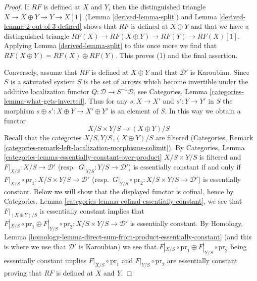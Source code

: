 \begin{proof}

If $RF$ is defined at $X$ and $Y$, then the distinguished triangle
$X \to X \oplus Y \to Y \to X[1]$ (Lemma \ref{derived-lemma-split}) and
Lemma \ref{derived-lemma-2-out-of-3-defined}
shows that $RF$ is defined at $X \oplus Y$ and that we
have a distinguished triangle
$RF(X) \to RF(X \oplus Y) \to RF(Y) \to RF(X)[1]$.
Applying Lemma \ref{derived-lemma-split} to this once more we find
that $RF(X \oplus Y) = RF(X) \oplus RF(Y)$.
This proves (1) and the final assertion.

\medskip\noindent
Conversely, assume that $RF$ is defined at $X \oplus Y$ and that $\mathcal{D}'$
is Karoubian. Since $S$ is a saturated system $S$ is the set of arrows which
become invertible under the additive localization functor
$Q : \mathcal{D} \to S^{-1}\mathcal{D}$, see
Categories, Lemma \ref{categories-lemma-what-gets-inverted}.
Thus for any $s : X \to X'$ and $s' : Y \to Y'$ in $S$ the morphism
$s \oplus s' : X \oplus Y \to X' \oplus Y'$ is an element of $S$.
In this way we obtain a functor
$$
X/S \times Y/S \longrightarrow (X \oplus Y)/S
$$
Recall that the categories $X/S, Y/S, (X \oplus Y)/S$ are filtered
(Categories, Remark
\ref{categories-remark-left-localization-morphisms-colimit}).
By Categories, Lemma \ref{categories-lemma-essentially-constant-over-product}
$X/S \times Y/S$ is filtered and
$F|_{X/S} : X/S \to \mathcal{D}'$ (resp.\ $G|_{Y/S} : Y/S \to \mathcal{D}'$)
is essentially constant if and only if
$F|_{X/S} \circ \text{pr}_1 : X/S \times Y/S \to \mathcal{D}'$
(resp.\ $G|_{Y/S} \circ \text{pr}_2 : X/S \times Y/S \to \mathcal{D}'$)
is essentially constant. Below we will show that the displayed functor
is cofinal, hence by
Categories, Lemma \ref{categories-lemma-cofinal-essentially-constant},
we see that $F|_{(X \oplus Y)/S}$ is essentially constant implies that
$F|_{X/S} \circ \text{pr}_1 \oplus F|_{Y/S} \circ \text{pr}_2 :
X/S \times Y/S \to \mathcal{D}'$
is essentially constant. By Homology, Lemma
\ref{homology-lemma-direct-sum-from-product-essentially-constant}
(and this is where we use that $\mathcal{D}'$ is Karoubian)
we see that
$F|_{X/S} \circ \text{pr}_1 \oplus F|_{Y/S} \circ \text{pr}_2$
being essentially constant implies
$F|_{X/S} \circ \text{pr}_1$ and
$F|_{Y/S} \circ \text{pr}_2$ are essentially constant proving that $RF$ is
defined at $X$ and $Y$.


\end{proof}
